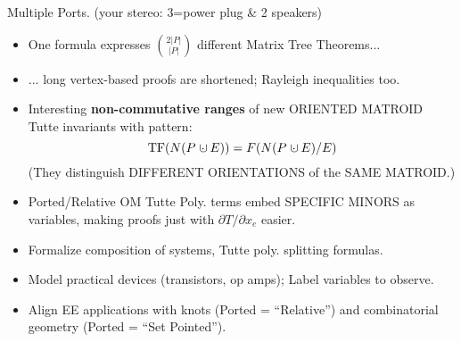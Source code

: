 \documentclass{beamer}
\newcommand{\dunion}
{\mbox{\hbox{\hskip0.45em$\cdot$\hskip-0.44em$\cup$\hskip0.2em}}}
\newcommand{\Remph}[1]{{\color{red}#1}}
\begin{document}
\begin{frame}{Multiple Ports. 
(your stereo: \Remph{3=}power plug \& 2 speakers) }

\begin{itemize}
\item One formula expresses $\binom{2|P|}{|P|}$ different Matrix Tree 
Theorems...
\item
... long vertex-based proofs are shortened; Rayleigh inequalities too.
\item
Interesting \textbf{non-commutative ranges} of
new ORIENTED MATROID Tutte invariants with pattern:
\[
\text{TF}(N(P\dunion E)) = F(N(P\dunion E)/E)
\]
(They distinguish DIFFERENT ORIENTATIONS of the SAME MATROID.)
\item
Ported/Relative OM Tutte Poly. terms \Remph{embed SPECIFIC MINORS} as
\Remph{variables}, making
proofs just with $\partial T/\partial x_e$ easier. 
\item
Formalize composition of systems\cite{NarayananDecompVS1986}, 
Tutte poly. splitting formulas.
\item
Model practical devices (transistors, op amps);
Label variables to observe.
\item 
Align EE applications with knots\cite{RelTuttePoly} (Ported = ``Relative'')
and combinatorial geometry\cite{SetPointedLV} (Ported = ``Set Pointed'').  
\end{itemize}
\end{frame}
\end{document}
